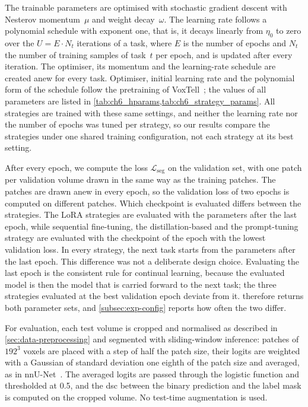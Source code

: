 The trainable parameters are optimised with stochastic gradient descent with Nesterov momentum~$\mu$ and weight decay~$\omega$.
The learning rate follows a polynomial schedule with exponent one, that is, it decays linearly from $\eta_0$ to zero over the $U = E \cdot N_t$ iterations of a task, where $E$ is the number of epochs and $N_t$ the number of training samples of task~$t$ per epoch, and is updated after every iteration.
The optimiser, its momentum and the learning-rate schedule are created anew for every task.
Optimiser, initial learning rate and the polynomial form of the schedule follow the pretraining of VoxTell~\cite{rokuss2025voxtellfreetextpromptableuniversal}; the values of all parameters are listed in \cref{tab:ch6_hparams,tab:ch6_strategy_params}.
All strategies are trained with these same settings, and neither the learning rate nor the number of epochs was tuned per strategy, so our results compare the strategies under one shared training configuration, not each strategy at its best setting.

After every epoch, we compute the loss $\mathcal{L}_{\mathrm{seg}}$ on the validation set, with one patch per validation volume drawn in the same way as the training patches.
The patches are drawn anew in every epoch, so the validation loss of two epochs is computed on different patches.
Which checkpoint is evaluated differs between the strategies.
The LoRA strategies are evaluated with the parameters after the last epoch, while sequential fine-tuning, the distillation-based and the prompt-tuning strategy are evaluated with the checkpoint of the epoch with the lowest validation loss.
In every strategy, the next task starts from the parameters after the last epoch.
This difference was not a deliberate design choice.
Evaluating the last epoch is the consistent rule for continual learning, because the evaluated model is then the model that is carried forward to the next task; the three strategies evaluated at the best validation epoch deviate from it.
 therefore returns both parameter sets, and \cref{subsec:exp-config} reports how often the two differ.

For evaluation, each test volume is cropped and normalised as described in \cref{sec:data-preprocessing} and segmented with sliding-window inference: patches of $192^3$ voxels are placed with a step of half the patch size, their logits are weighted with a Gaussian of standard deviation one eighth of the patch size and averaged, as in nnU-Net~\cite{isensee2018nnunetselfadaptingframeworkunetbased}.
The averaged logits are passed through the logistic function and thresholded at 0.5, and the \gls{dsc} between the binary prediction and the label mask is computed on the cropped volume.
No test-time augmentation is used.

